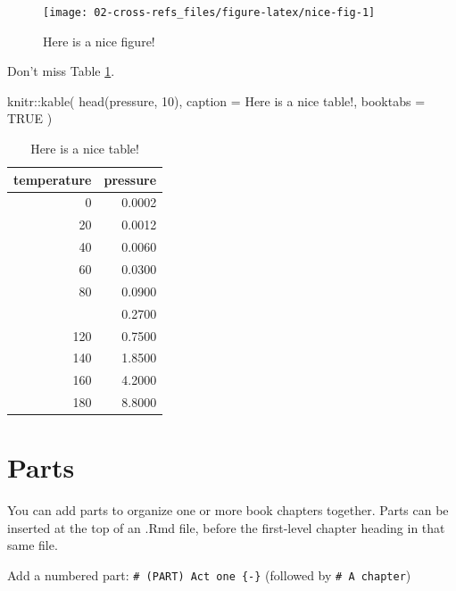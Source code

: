 \documentclass[
]{book}
\newenvironment{Shaded}{\begin{snugshade}}{\end{snugshade}}
\newcommand{\AttributeTok}[1]{\textcolor[rgb]{0.77,0.63,0.00}{#1}}
\newcommand{\ConstantTok}[1]{\textcolor[rgb]{0.00,0.00,0.00}{#1}}
\newcommand{\DecValTok}[1]{\textcolor[rgb]{0.00,0.00,0.81}{#1}}
\newcommand{\FunctionTok}[1]{\textcolor[rgb]{0.00,0.00,0.00}{#1}}
\newcommand{\NormalTok}[1]{#1}
\newcommand{\SpecialCharTok}[1]{\textcolor[rgb]{0.00,0.00,0.00}{#1}}
\newcommand{\StringTok}[1]{\textcolor[rgb]{0.31,0.60,0.02}{#1}}
\theoremstyle{definition}
\theoremstyle{definition}
\theoremstyle{definition}
\theoremstyle{definition}
\theoremstyle{remark}
\begin{document}
\begin{figure}

{\centering \texttt{[image: 02-cross-refs\_files/figure-latex/nice-fig-1]} 

}

\caption{Here is a nice figure!}\label{fig:nice-fig}
\end{figure}

Don't miss Table \ref{tab:nice-tab}.

\begin{Shaded}
\begin{Highlighting}[]
\NormalTok{knitr}\SpecialCharTok{::}\FunctionTok{kable}\NormalTok{(}
  \FunctionTok{head}\NormalTok{(pressure, }\DecValTok{10}\NormalTok{), }\AttributeTok{caption =} \StringTok{\textquotesingle{}Here is a nice table!\textquotesingle{}}\NormalTok{,}
  \AttributeTok{booktabs =} \ConstantTok{TRUE}
\NormalTok{)}
\end{Highlighting}
\end{Shaded}

\begin{table}

\caption{\label{tab:nice-tab}Here is a nice table!}
\centering
\begin{tabular}[t]{rr}
\toprule
temperature & pressure\\
\midrule
0 & 0.0002\\
20 & 0.0012\\
40 & 0.0060\\
60 & 0.0300\\
80 & 0.0900\\
\addlinespace
100 & 0.2700\\
120 & 0.7500\\
140 & 1.8500\\
160 & 4.2000\\
180 & 8.8000\\
\bottomrule
\end{tabular}
\end{table}

\hypertarget{parts}{%
\chapter{Parts}\label{parts}}

You can add parts to organize one or more book chapters together. Parts can be inserted at the top of an .Rmd file, before the first-level chapter heading in that same file.

Add a numbered part: \texttt{\#\ (PART)\ Act\ one\ \{-\}} (followed by \texttt{\#\ A\ chapter})
\end{document}
